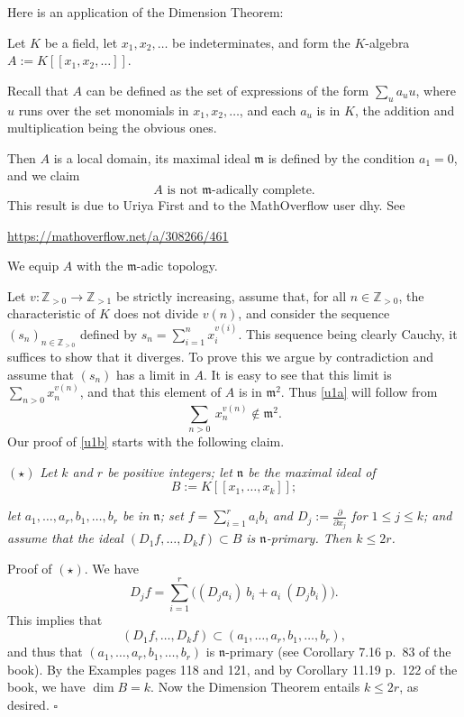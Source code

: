\documentclass[parskip=half,fontsize=12pt]{scrartcl}%
\newcommand{\mf}{\mathfrak}
\newcommand{\mmm}{\mf m}
\begin{document}
Here is an application of the Dimension Theorem: 

Let $K$ be a field, let $x_1,x_2,\dots$ be indeterminates, and form the $K$-algebra  $A:=K[[x_1,x_2,\dots]]$. 

Recall that $A$ can be defined as the set of expressions of the form $\sum_ua_uu$, where $u$ runs over the set monomials in $x_1,x_2,\dots$, and each $a_u$ is in $K$, the addition and multiplication being the obvious ones. 

Then $A$ is a local domain, its maximal ideal $\mathfrak m$ is defined by the condition $a_1=0$, and we claim 
\begin{equation}\label{u1a}
\boxed{A\text{ is not }\mathfrak m\text{-adically complete.}}
\end{equation}
This result is due to Uriya First and to the MathOverflow user dhy. See \\ %

\centerline{\href{https://mathoverflow.net/a/308266/461}{https://mathoverflow.net/a/308266/461}}

We equip $A$ with the $\mmm$-adic topology.

Let $v:\mathbb Z_{>0}\to\mathbb Z_{>1}$ be strictly increasing, assume that, for all $n\in\mathbb Z_{>0}$, the characteristic of $K$ does not divide $v(n)$, and consider the sequence $(s_n)_{n\in\mathbb Z_{>0}}$ defined by $s_n=\sum_{i=1}^nx_i^{v(i)}$. This sequence being clearly Cauchy, it suffices to show that it diverges. To prove this we argue by contradiction and assume that $(s_n)$ has a limit in $A$. It is easy to see that this limit is $\sum_{n>0}x_n^{v(n)}$, and that this element of $A$ is in $\mmm^2$. Thus \eqref{u1a} will follow from 
\begin{equation}\label{u1b}
\sum_{n>0}\ x_n^{v(n)}\notin\mmm^2.
\end{equation} 
Our proof of \eqref{u1b} starts with the following claim.

$(\star)$ {\em Let $k$ and $r$ be positive integers; let $\mathfrak n$ be the maximal ideal of} 
$$
B:=K[[x_1,\dots,x_k]];
$$ 

{\em let $a_1,\dots,a_r,b_1,\dots,b_r$ be in $\mathfrak n$; set $f=\sum_{i=1}^ra_ib_i$ and $D_j:=\frac{\partial}{\partial x_j}$ for $1\le j\le k$; and assume that the ideal $(D_1f,\dots,D_kf)\subset B$ is $\mathfrak n$-primary. Then $k\le2r$.}

Proof of $(\star)$. We have 
$$
D_jf=\sum_{i=1}^r\Big((D_ja_i)\ b_i+a_i\ (D_jb_i)\Big). 
$$ 
This implies that 
$$
(D_1f,\dots,D_kf)\subset(a_1,\dots,a_r,b_1,\dots,b_r),
$$ 
and thus that $(a_1,\dots,a_r,b_1,\dots,b_r)$ is $\mathfrak n$-primary (see Corollary 7.16 p.~83 of the book). By the Examples pages 118 and 121, and by Corollary 11.19 p.~122 of the book, we have $\dim B=k$. Now the Dimension Theorem entails $k\le2r$, as desired. $\square$
\end{document}
